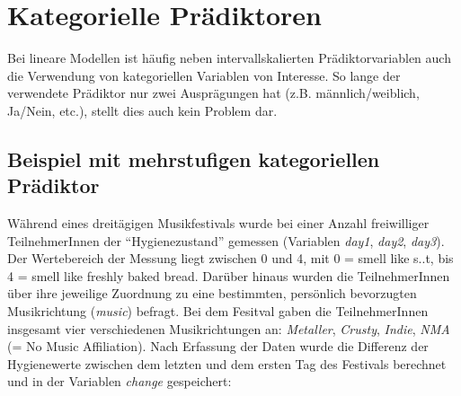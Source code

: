 \documentclass[]{article}
\begin{document}
\hypertarget{kategorielle-pradiktoren}{%
\section*{Kategorielle Prädiktoren}\label{kategorielle-pradiktoren}}

Bei lineare Modellen ist häufig neben intervallskalierten Prädiktorvariablen auch die Verwendung von kategoriellen Variablen von Interesse. So lange der verwendete Prädiktor nur zwei Ausprägungen hat (z.B. männlich/weiblich, Ja/Nein, etc.), stellt dies auch kein Problem dar.

\hypertarget{beispiel-mit-mehrstufigen-kategoriellen-pradiktor}{%
\subsection*{Beispiel mit mehrstufigen kategoriellen Prädiktor}\label{beispiel-mit-mehrstufigen-kategoriellen-pradiktor}}

Während eines dreitägigen Musikfestivals wurde bei einer Anzahl freiwilliger TeilnehmerInnen der ``Hygienezustand'' gemessen (Variablen \emph{day1}, \emph{day2}, \emph{day3}). Der Wertebereich der Messung liegt zwischen 0 und 4, mit 0 = smell like s..t, bis 4 = smell like freshly baked bread. Darüber hinaus wurden die TeilnehmerInnen über ihre jeweilige Zuordnung zu eine bestimmten, persönlich bevorzugten Musikrichtung (\emph{music}) befragt. Bei dem Fesitval gaben die TeilnehmerInnen insgesamt vier verschiedenen Musikrichtungen an: \emph{Metaller}, \emph{Crusty}, \emph{Indie}, \emph{NMA} (= No Music Affiliation). Nach Erfassung der Daten wurde die Differenz der Hygienewerte zwischen dem letzten und dem ersten Tag des Festivals berechnet und in der Variablen \emph{change} gespeichert:
\end{document}
